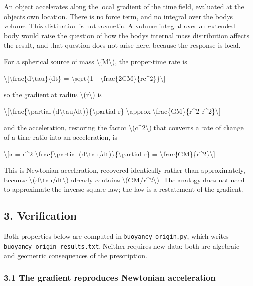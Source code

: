 \documentclass[
  10pt,
]{article}
\begin{document}
An object accelerates along the local gradient of the time field,
evaluated at the object\textquotesingle s own location. There is no
force term, and no integral over the body\textquotesingle s volume. This
distinction is not cosmetic. A volume integral over an extended body
would raise the question of how the body\textquotesingle s internal mass
distribution affects the result, and that question does not arise here,
because the response is local.

For a spherical source of mass \textbackslash(M\textbackslash), the
proper-time rate is

\textbackslash{[}\textbackslash frac\{d\textbackslash tau\}\{dt\} =
\textbackslash sqrt\{1 -
\textbackslash frac\{2GM\}\{rc\^{}2\}\}\textbackslash{]}

so the gradient at radius \textbackslash(r\textbackslash) is

\textbackslash{[}\textbackslash frac\{\textbackslash partial
(d\textbackslash tau/dt)\}\{\textbackslash partial r\}
\textbackslash approx \textbackslash frac\{GM\}\{r\^{}2
c\^{}2\}\textbackslash{]}

and the acceleration, restoring the factor
\textbackslash(c\^{}2\textbackslash) that converts a rate of change of a
time ratio into an acceleration, is

\textbackslash{[}a = c\^{}2 \textbackslash frac\{\textbackslash partial
(d\textbackslash tau/dt)\}\{\textbackslash partial r\} =
\textbackslash frac\{GM\}\{r\^{}2\}\textbackslash{]}

This is Newtonian acceleration, recovered identically rather than
approximately, because
\textbackslash(d\textbackslash tau/dt\textbackslash) already contains
\textbackslash(GM/r\^{}2\textbackslash). The analogy does not need to
approximate the inverse-square law; the law is a restatement of the
gradient.

\hypertarget{verification}{%
\subsection{3. Verification}\label{verification}}

Both properties below are computed in \texttt{buoyancy\_origin.py},
which writes \texttt{buoyancy\_origin\_results.txt}. Neither requires
new data: both are algebraic and geometric consequences of the
prescription.

\hypertarget{the-gradient-reproduces-newtonian-acceleration}{%
\subsubsection{3.1 The gradient reproduces Newtonian
acceleration}\label{the-gradient-reproduces-newtonian-acceleration}}
\end{document}
